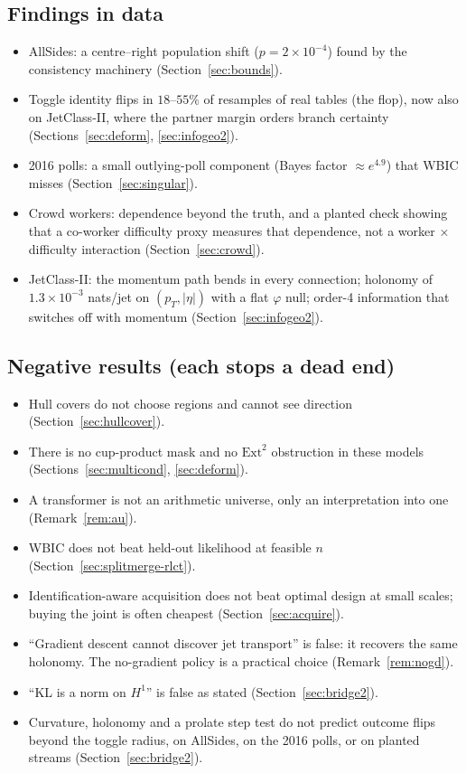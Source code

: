 \documentclass[11pt]{article}
\theoremstyle{definition}
\theoremstyle{remark}
\begin{document}
\subsection*{Findings in data}
\begin{itemize}
  \item AllSides: a centre--right population shift ($p=2\times10^{-4}$) found by the consistency machinery (Section~\ref{sec:bounds}).
  \item Toggle identity flips in $18$--$55\%$ of resamples of real tables (the flop), now also on JetClass-II, where the partner margin orders branch certainty (Sections~\ref{sec:deform}, \ref{sec:infogeo2}).
  \item 2016 polls: a small outlying-poll component (Bayes factor $\approx e^{4.9}$) that WBIC misses (Section~\ref{sec:singular}).
  \item Crowd workers: dependence beyond the truth, and a planted check showing that a co-worker difficulty proxy measures that dependence, not a worker $\times$ difficulty interaction (Section~\ref{sec:crowd}).
  \item JetClass-II: the momentum path bends in every connection; holonomy of $1.3\times10^{-3}$ nats/jet on $(p_T,|\eta|)$ with a flat $\varphi$ null; order-4 information that switches off with momentum (Section~\ref{sec:infogeo2}).
\end{itemize}

\subsection*{Negative results (each stops a dead end)}
\begin{itemize}
  \item Hull covers do not choose regions and cannot see direction (Section~\ref{sec:hullcover}).
  \item There is no cup-product mask and no $\mathrm{Ext}^2$ obstruction in these models (Sections~\ref{sec:multicond}, \ref{sec:deform}).
  \item A transformer is not an arithmetic universe, only an interpretation into one (Remark~\ref{rem:au}).
  \item WBIC does not beat held-out likelihood at feasible $n$ (Section~\ref{sec:splitmerge-rlct}).
  \item Identification-aware acquisition does not beat optimal design at small scales; buying the joint is often cheapest (Section~\ref{sec:acquire}).
  \item ``Gradient descent cannot discover jet transport'' is false: it recovers the same holonomy. The no-gradient policy is a practical choice (Remark~\ref{rem:nogd}).
  \item ``KL is a norm on $H^1$'' is false as stated (Section~\ref{sec:bridge2}).
  \item Curvature, holonomy and a prolate step test do not predict outcome flips beyond the toggle radius, on AllSides, on the 2016 polls, or on planted streams (Section~\ref{sec:bridge2}).
\end{itemize}
\end{document}
